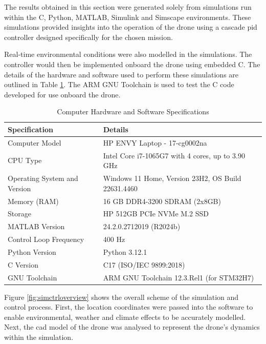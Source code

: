 The results obtained in this section were generated solely from simulations run within the C, Python, MATLAB, Simulink and Simscape environments. These simulations provided insights into the operation of the drone using a cascade \gls{pid} controller designed specifically for the chosen mission.  

Real-time environmental conditions were also modelled in the simulations. The controller would then be implemented onboard the drone using embedded C. The details of the hardware and software used to perform these simulations are outlined in Table \ref{tab:computersetup}. The ARM GNU Toolchain is used to test the C code developed for use onboard the drone.  
\begin{table}[h]
\vspace{5mm}
\begin{center}
\begin{tabular}{| p{6cm}|p{10cm}|}
 \hline
 \textbf{Specification}       & Details\\ 
 \hline
 Computer Model                & HP ENVY Laptop - 17-cg0002na          \\ 
 CPU Type                     & Intel Core i7-1065G7 with 4 cores, up to 3.90 GHz \\ 
 Operating System and Version & Windows 11 Home, Version 23H2, OS Build 22631.4460 \\ 
 Memory (RAM)                 & 16 GB DDR4-3200 SDRAM (2x8GB)      \\  
 Storage                      & HP 512GB PCIe NVMe M.2 SSD            \\ 
 MATLAB Version               & 24.2.0.2712019 (R2024b) \\
 Control Loop Frequency&400 Hz\\ 
  Python Version& Python 3.12.1\\
 C Version&C17 (ISO/IEC 9899:2018)\\ 
 GNU Toolchain& ARM GNU Toolchain 12.3.Rel1 (for STM32H7)\\ 
 \hline
\end{tabular}
\end{center}
\caption{Computer Hardware and Software Specifications}
\label{tab:computersetup}
\end{table}

Figure \ref{fig:simctrloverview} shows the overall scheme of the simulation and control process. First, the location coordinates were passed into the software to enable environmental, weather and climate effects to be accurately modelled. Next, the \gls{cad} model of the drone was analysed to represent the drone's dynamics within the simulation.

